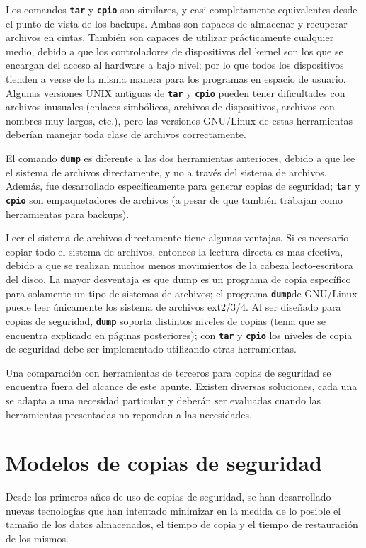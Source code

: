 \documentclass[12pt]{article}
\begin{document}
Los comandos \texttt{\textbf{tar}} y \texttt{\textbf{cpio}}
son similares, y casi completamente equivalentes desde el punto de 
vista de los backups. Ambas son capaces de almacenar y recuperar 
archivos en cintas. También son capaces de utilizar 
prácticamente cualquier medio, debido a que los controladores de 
dispositivos del kernel son los que se encargan del acceso al hardware a 
bajo nivel; por lo que todos los dispositivos
tienden a verse de la misma manera para los programas en espacio de usuario.
Algunas versiones  UNIX antiguas de \texttt{\textbf{tar}} y 
\texttt{\textbf{cpio}} pueden tener dificultades con archivos inusuales 
(enlaces simbólicos, archivos de dispositivos, archivos con nombres
muy largos, etc.), pero las versiones GNU/Linux de estas herramientas 
deberían manejar toda clase de archivos correctamente.

El comando \texttt{\textbf{dump}} es diferente a las dos herramientas 
anteriores, debido a que lee el sistema de archivos directamente, y no a 
través del sistema de archivos.  Además, fue desarrollado específicamente 
para generar copias de seguridad; \texttt{\textbf{tar}} y 
\texttt{\textbf{cpio}} son empaquetadores de archivos 
(a pesar de que también trabajan como herramientas para backups).

Leer el sistema de archivos directamente tiene algunas ventajas.
Si es necesario copiar todo el sistema de archivos, entonces la lectura 
directa es mas efectiva, debido a que se realizan muchos menos movimientos 
de la cabeza lecto-escritora del disco. La mayor desventaja es que dump es 
un programa de copia específico para solamente un tipo de sistemas de 
archivos; el programa \texttt{\textbf{dump}}de GNU/Linux puede leer 
únicamente los sistema de archivos ext2/3/4. Al ser diseñado para copias
de seguridad, \texttt{\textbf{dump}} soporta distintos niveles de copias
 (tema que se encuentra explicado en páginas posteriores); con 
\texttt{\textbf{tar}} y \texttt{\textbf{cpio}} los niveles de copia de 
seguridad debe ser implementado utilizando otras herramientas.

Una comparación con herramientas de terceros para copias de seguridad se 
encuentra fuera del alcance de este apunte. Existen diversas soluciones, 
cada una se adapta a una necesidad particular y deberán ser evaluadas 
cuando las herramientas presentadas no repondan a las necesidades. 

\section*{Modelos de copias de seguridad}
Desde los primeros años de uso de copias de seguridad, se han desarrollado 
nuevas tecnologías que han intentado minimizar en la medida de lo posible 
el tamaño de los datos almacenados, el tiempo de copia y el tiempo de 
restauración de los mismos.
\end{document}
